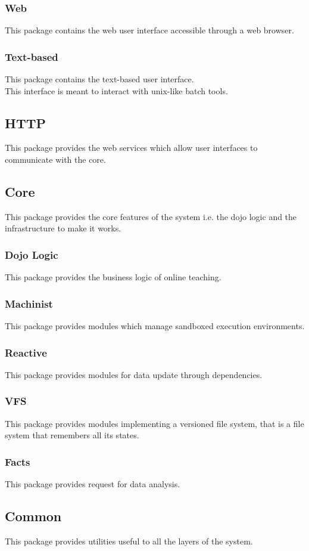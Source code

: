 		\subsubsection{Web}
			This package contains the web user interface accessible through a web browser.
		\subsubsection{Text-based}
			This package contains the text-based user interface.\\
			This interface is meant to interact with unix-like batch tools.
	\subsection{HTTP}
		This package provides the web services which allow user interfaces to communicate with the core.
	\subsection{Core}
		This package provides the core features of the system i.e. the dojo logic and the infrastructure to make it works.
		\subsubsection{Dojo Logic}
			This package provides the business logic of online teaching.
		\subsubsection{Machinist}
			This package provides modules which manage sandboxed execution environments.
		\subsubsection{Reactive}
			This package provides modules for data update through dependencies.
		\subsubsection{VFS}
			This package provides modules implementing a versioned file system, that is a file system that remembers all its states.
		\subsubsection{Facts}
			This package provides request for data analysis.
	\subsection{Common}
		This package provides utilities useful to all the layers of the system.
